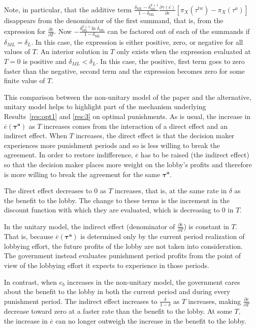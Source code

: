 \documentclass[authoryear, review]{elsarticle}
\newcommand{\ov}{\overline}
\newcommand{\bta}{\bm{\tau^a}}
\newcommand{\ga}{\gamma}
\newcommand{\de}{\delta}
\begin{document}
Note, in particular, that the additive term $\frac{\de_\text{ML} - \de_\text{ML}^{T+1}}{1-\de_\text{ML}}\frac{\partial \ga(\ov{e})}{\partial e} \left[ \pi_X(\tau^{tw}) - \pi_X(\tau^a) \right]$ disappears from the denominator of the first summand, that is, from the expression for $\frac{\partial \ov{e}}{\partial T}.$ Now $-\frac{\de_\text{ML}^{T+1}\ln\de_\text{ML}}{1-\de_\text{ML}}$ can be factored out of each of the summands if $\de_{ML} = \de_L$. In this case, the expression is either positive, zero, or negative for all values of $T$. An interior solution in $T$ only exists when the expression evaluated at $T=0$ is positive and $\de_{ML} < \de_L$. In this case, the positive, first term goes to zero faster than the negative, second term and the expression becomes zero for some finite value of $T$.

This comparison between the non-unitary model of the paper and the alternative, unitary model helps to highlight part of the mechanism underlying Results~\ref{res:opt1} and \ref{res:3} on optimal punishments. As is usual, the increase in $\ov{e}(\bta)$ as $T$ increases comes from the interaction of a direct effect and an indirect effect. When $T$ increases, the direct effect is that the decision maker experiences more punishment periods and so is less willing to break the agreement. In order to restore indifference, $\ov{e}$ has to be raised (the indirect effect) so that the decision maker places more weight on the lobby's profits and therefore is more willing to break the agreement for the same $\bta$.

The direct effect decreases to $0$ as $T$ increases, that is, at the same rate in $\de$ as the benefit to the lobby. The change to these terms is the increment in the discount function with which they are evaluated, which is decreasing to 0 in $T$.

In the unitary model, the indirect effect (denominator of $\frac{\partial \ov{e}}{\partial T}$) is constant in $T$. That is, because $\ov{e}(\bta)$ is determined only by the current period realization of lobbying effort, the future profits of the lobby are not taken into consideration. The government instead evaluates punishment period profits from the point of view of the lobbying effort it expects to experience in those periods. 

In contrast, when $e_b$ increases in the non-unitary model, the government cares about the benefit to the lobby in both the current period and during every punishment period. The indirect effect increases to $\frac{\de}{1-\de}$ as $T$ increases, making $\frac{\partial \ov{e}}{\partial T}$ decrease toward zero at a faster rate than the benefit to the lobby. At some $T$, the increase in $\ov{e}$ can no longer outweigh the increase in the benefit to the lobby.
\end{document}
